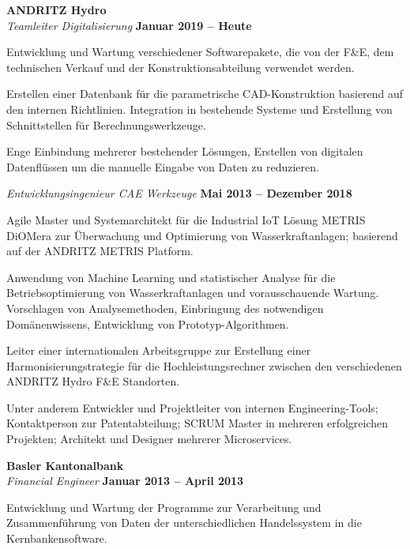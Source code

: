 \documentclass[line,11pt,a4paper]{../resume}
\begin{document}
\begin{resume}
\textbf{ANDRITZ Hydro}\\\vspace{1mm}%
\textsl{Teamleiter Digitalisierung} \hfill \textbf{Januar 2019 -- Heute}\\
\vspace{-4mm}%
\begin{list2}
  \item Entwicklung und Wartung verschiedener Softwarepakete, die von der F\&E,
    dem technischen Verkauf und der Konstruktionsabteilung verwendet werden.
  \item Erstellen einer Datenbank für die parametrische CAD-Konstruktion
    basierend auf den internen Richtlinien. Integration in bestehende Systeme
    und Erstellung von Schnittstellen für Berechnungswerkzeuge.
  \item Enge Einbindung mehrerer bestehender Lösungen, Erstellen von digitalen
    Datenflüssen um die manuelle Eingabe von Daten zu reduzieren.
\end{list2}

\textsl{Entwicklungsingenieur CAE Werkzeuge} \hfill \textbf{Mai 2013 -- Dezember 2018}\\
\vspace{-4mm}%
\begin{list2}
  \item Agile Master und Systemarchitekt für die Industrial IoT Lösung METRIS
    DiOMera zur Überwachung und Optimierung von Wasserkraftanlagen; basierend
    auf der ANDRITZ METRIS Platform.

  \item Anwendung von Machine Learning und statistischer Analyse für die
    Betriebsoptimierung von Wasserkraftanlagen und vorausschauende Wartung.
    Vorschlagen von Analysemethoden, Einbringung des notwendigen
    Domänenwissens, Entwicklung von Prototyp-Algorithmen.

  \item Leiter einer internationalen Arbeitsgruppe zur Erstellung
    einer Harmonisierungstrategie für die Hochleistungsrechner zwischen den
    verschiedenen ANDRITZ Hydro F\&E Standorten.

  \item Unter anderem Entwickler und Projektleiter von internen
    Engineering-Tools; Kontaktperson zur Patentabteilung; SCRUM Master in
    mehreren erfolgreichen Projekten; Architekt und Designer mehrerer
    Microservices.
\end{list2}

\textbf{Basler Kantonalbank}\\\vspace{1mm}%
\textsl{Financial Engineer} \hfill \textbf{Januar 2013 -- April 2013}\\
\vspace{-4mm}%
\begin{list2}
  \item Entwicklung und Wartung der Programme zur Verarbeitung und
    Zusammenführung von Daten der unterschiedlichen Handelssystem in die
    Kernbankensoftware.
\end{list2}


\end{resume}
\end{document}
